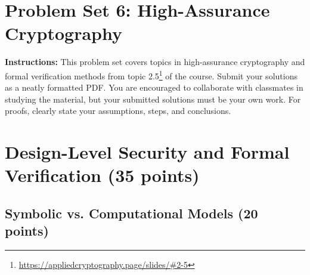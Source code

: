 \documentclass[10pt,a4paper,american]{article}
\begin{document}
\classhandoutheader

\section*{Problem Set 6: High-Assurance Cryptography}

\begin{tcolorbox}[colframe=OliveGreen!30!white,colback=OliveGreen!5!white]
	\textbf{Instructions:} This problem set covers topics in high-assurance cryptography and formal verification methods from topic 2.5\footnote{\url{https://appliedcryptography.page/slides/\#2-5}} of the course. Submit your solutions as a neatly formatted PDF. You are encouraged to collaborate with classmates in studying the material, but your submitted solutions must be your own work. For proofs, clearly state your assumptions, steps, and conclusions.
\end{tcolorbox}

\section{Design-Level Security and Formal Verification (35 points)}

\subsection{Symbolic vs. Computational Models (20 points)}
\end{document}
